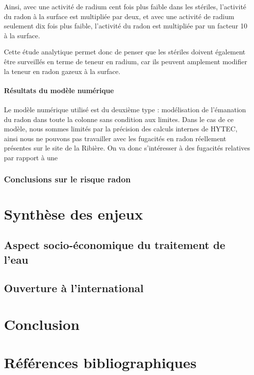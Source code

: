 \documentclass{article}
\begin{document}
Ainsi, avec une activité de radium cent fois plus faible dans les stériles, l'activité du radon à la surface est multipliée par deux, et avec une activité de radium seulement dix fois plus faible, l'activité du radon est multipliée par un facteur 10 à la surface.

Cette étude analytique permet donc de penser que les stériles doivent également être surveillés en terme de teneur en radium, car ils peuvent amplement modifier la teneur en radon gazeux à la surface.

\paragraph{Résultats du modèle numérique}
\paragraph{} Le modèle numérique utilisé est du deuxième type : modélisation de l'émanation du radon dans toute la colonne sans condition aux limites. Dans le cas de ce modèle, nous sommes limités par la précision des calculs internes de HYTEC, ainsi nous ne pouvons pas travailler avec les fugacités en radon réellement présentes sur le site de la Ribière. On va donc s'intéresser à des fugacités relatives par rapport à une

\subsubsection{Conclusions sur le risque radon}

\newpage
\section{Synthèse des enjeux}
\subsection{Aspect socio-économique du traitement de l’eau}
\subsection{Ouverture à l’international}

\newpage
\section*{Conclusion}

\newpage
\section*{Références bibliographiques}
\end{document}
